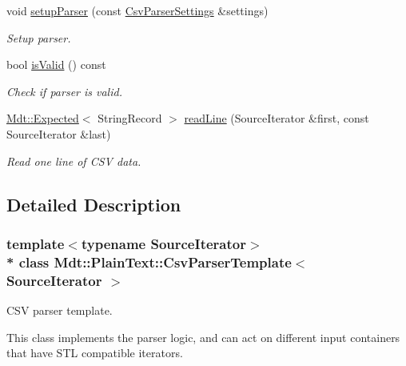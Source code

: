 \begin{DoxyCompactItemize}
\item 
void \hyperlink{class_mdt_1_1_plain_text_1_1_csv_parser_template_a95c35ee9721efec0aedcf8b18b310001}{setup\+Parser} (const \hyperlink{class_mdt_1_1_plain_text_1_1_csv_parser_settings}{Csv\+Parser\+Settings} \&settings)
\begin{DoxyCompactList}\small\item\em Setup parser. \end{DoxyCompactList}\item 
bool \hyperlink{class_mdt_1_1_plain_text_1_1_csv_parser_template_a215191b75041f462135572f328669731}{is\+Valid} () const 
\begin{DoxyCompactList}\small\item\em Check if parser is valid. \end{DoxyCompactList}\item 
\hyperlink{class_mdt_1_1_expected}{Mdt\+::\+Expected}$<$ String\+Record $>$ \hyperlink{class_mdt_1_1_plain_text_1_1_csv_parser_template_aa6a88c11fa8def4ee7fd3437d9099a95}{read\+Line} (Source\+Iterator \&first, const Source\+Iterator \&last)
\begin{DoxyCompactList}\small\item\em Read one line of C\+SV data. \end{DoxyCompactList}\end{DoxyCompactItemize}


\subsection{Detailed Description}
\subsubsection*{template$<$typename Source\+Iterator$>$\\*
class Mdt\+::\+Plain\+Text\+::\+Csv\+Parser\+Template$<$ Source\+Iterator $>$}

C\+SV parser template. 

This class implements the parser logic, and can act on different input containers that have S\+TL compatible iterators.


